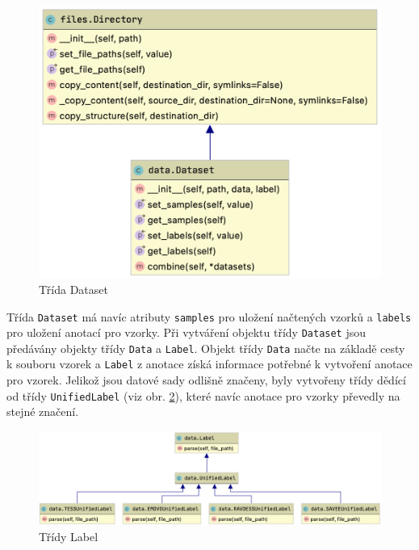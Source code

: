 \documentclass[FM,BP]{tulthesis}
\begin{document}
\begin{figure}[h!]
\centerline{\includegraphics[scale=.25,keepaspectratio]{data-dataset.png}}
\caption{Třída Dataset}
\label{fig:datasets}
\end{figure}
\FloatBarrier

Třída \texttt{\mbox{Dataset}} má navíc atributy \texttt{\mbox{samples}} pro uložení načtených vzorků a \texttt{\mbox{labels}} pro uložení anotací pro vzorky. Při vytváření objektu třídy \texttt{\mbox{Dataset}} jsou předávány objekty třídy \texttt{\mbox{Data}} a \texttt{\mbox{Label}}. Objekt třídy \texttt{\mbox{Data}} načte na základě cesty k souboru vzorek a \texttt{\mbox{Label}} z anotace získá informace potřebné k vytvoření anotace pro vzorek. Jelikož jsou datové sady odlišně značeny, byly vytvořeny třídy dědící od třídy \texttt{\mbox{UnifiedLabel}} (viz obr. \mbox{\ref{fig:label}}), které navíc anotace pro vzorky převedly na stejné značení.

\begin{figure}[ht]
\centerline{\includegraphics[scale=.25,keepaspectratio]{data-label.png}}
\caption{Třídy Label}
\label{fig:label}
\end{figure}
\FloatBarrier
\end{document}
